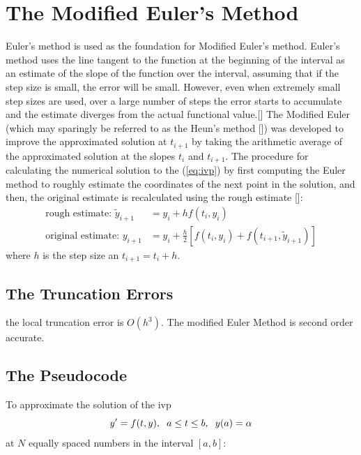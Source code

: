 \documentclass[12pt,oneside]{book}
\begin{document}
	\section{The Modified Euler's Method} \label{m:meul}
		\begin{spacing}{1.2}
			
			Euler's method is used as the foundation for Modified Euler's method. Euler's method uses the line tangent to the function at the beginning of the interval as an estimate of the slope of the function over the interval, assuming that if the step size is small, the error will be small. However, even when extremely small step sizes are used, over a large number of steps the error starts to accumulate and the estimate diverges from the actual functional value.[] \newline
			The Modified Euler (which may sparingly be referred to as the Heun's method []) was developed to improve the approximated solution at $t_{i+1}$ by taking the arithmetic average of the approximated solution at the slopes $t_{i}$ and $t_{i+1}$. \newline
			The procedure for calculating the numerical solution to the (\ref{eq:ivp}) by first computing the Euler method to roughly estimate the coordinates of the next point in the solution, and then, the original estimate is recalculated using the rough estimate []:
				\begin{equation}
					\begin{split}
						\text{rough estimate: } \tilde{y}_{i+1} & = y_{i} + hf(t_{i}, y_{i}) \\
						\text{original estimate: } y_{i+1} & = y_{i} + \frac{h}{2} \left[f(t_{i}, y_{i}) + f(t_{i+1}, \tilde{y}_{i+1}) \right]
					\end{split}
				\end{equation}
				where $ h $ is the step size an $ t_{i+1} = t_{i} + h. $
			
			\subsection*{The Truncation Errors}
				the local truncation error is $ O(h^{3}) $. The modified Euler Method is second order accurate.
			
			\clearpage
			\subsection*{The Pseudocode}
				To approximate the solution of the \ac{ivp} 
				\[ y' = f(t,y), \hspace*{0.2cm} a \leq t \leq b, \hspace*{0.2cm} y(a) = \alpha \]
				at $ N $ equally spaced numbers in the interval $ [a, b]: $
				

\end{spacing}
\end{document}
